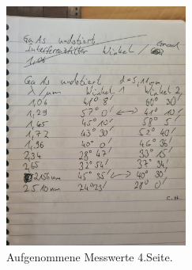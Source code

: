 \begin{figure} [H]
    \centering
    \includegraphics[height=8cm]{content/messwerte_4.jpeg}
    \caption{Aufgenommene Messwerte 4.Seite.}
\end{figure}